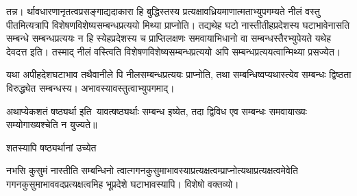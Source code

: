तन्न।
र्थावधारणानृतत्वप्रसङ्गाद्यदाकारा हि बु\mme द्धिस्तस्य प्रत्यक्षावध्रियमाणात्मताभ्युपगम्यते %
नीलं वस्तु पीतमित्यत्रापि विशेषणविशेष्यसम्बन्धप्रत्ययो मिथ्या प्राप्नोति। %
तद्यथेह घटो नास्तीतीहप्रदेशस्य घटाभावेनासति सम्बन्धे सम्बन्धप्रत्ययः \mme
न हि स्येहप्रदेशस्य च प्राप्ति\mms लक्षणः समवायाभिधानो वा सम्बन्धस्तैरभ्युपेयते यथेह देवदत्त इति। %
तस्माद् %
%
नीलं वस्त्विति विशेषणविशेष्यसम्बन्धप्रत्ययो अपि सम्बन्धप्रत्ययत्वान्मि\mme थ्या प्रसज्येत।

यथा 
%
अपीहदेशघटाभाव\mms %
%
तथैवानीले पि
नीलसम्बन्धप्रत्ययः प्राप्नोति, तथा सम्बन्धिष्वप्यथास्त्येव सम्बन्धः द्विष्ठता विरुद्ध्येत सम्बन्धस्य। अ\mme भावस्यावस्तुत्वाभ्युपगमाद्।

अथाप्येकशतं षष्ठ्यर्था इ\mms ति\ यावत्षष्ठ्यर्थाः सम्बन्ध इष्येत, त\mme दा द्विविध एव सम्\mms बन्धः समवायाख्यः सम्योगाख्यश्चेति न युज्यते॥ %

शतस्यापि षष्ठ्यर्थानां %
उच्येत 

नभसि कुसुमं नास्तीति सम्बन्धिनो %
त्वात्गगन\mms कुसुमाभावस्याप्रत्यक्षत्वम्प्राप्नोत्यथाप्रत्यक्षत्वमेवेति
गगनकुसुमाभाव\mme वदप्रत्यक्षत्वमिह भूप्रदेशे घटाभावस्यापि। विशे\mms षो वक्तव्यो। %


